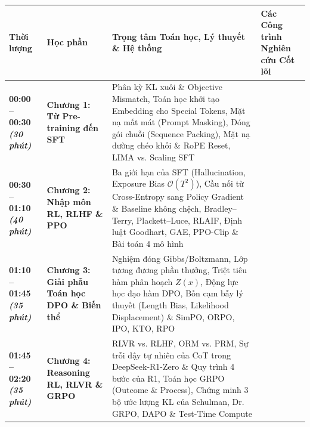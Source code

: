 \documentclass[11pt,a4paper,oneside]{report}
\theoremstyle{plain}
\theoremstyle{definition}
\theoremstyle{remark}
\begin{document}
\begin{table}[h!]
\centering
\small
\renewcommand{\arraystretch}{1.35}
\begin{tabularx}{\textwidth}{>{\bfseries}p{2.3cm} >{\bfseries}p{3.2cm} X p{3.8cm}}
\toprule
Thời lượng & Học phần & Trọng tâm Toán học, Lý thuyết \& Hệ thống & Các Công trình Nghiên cứu Cốt lõi \\
\midrule
00:00 -- 00:30 \newline \textit{(30 phút)} & Chương 1: \newline Từ Pre-training đến SFT & Phân kỳ KL xuôi \& Objective Mismatch, Toán học khởi tạo Embedding cho Special Tokens, Mặt nạ mất mát (Prompt Masking), Đóng gói chuỗi (Sequence Packing), Mặt nạ đường chéo khối \& RoPE Reset, LIMA vs. Scaling SFT & \citet{brown2020language, ouyang2022training, hewitt2021initializing, su2024roformer, zhou2023lima, dubey2024llama, lambert2024tulu} \\
\midrule
00:30 -- 01:10 \newline \textit{(40 phút)} & Chương 2: \newline Nhập môn RL, RLHF \& PPO & Ba giới hạn của SFT (Hallucination, Exposure Bias $\mathcal{O}(T^2)$), Cầu nối từ Cross-Entropy sang Policy Gradient \& Baseline không chệch, Bradley--Terry, Plackett--Luce, RLAIF, Định luật Goodhart, GAE, PPO-Clip \& Bài toán 4 mô hình & \citet{williams1992simple, bradley1952rank, schulman2016high, schulman2017proximal, christiano2017deep, stiennon2020learning, bai2022constitutional, gao2023scaling, kang2024unfamiliar} \\
\midrule
01:10 -- 01:45 \newline \textit{(35 phút)} & Chương 3: \newline Giải phẫu Toán học DPO \& Biến thể & Nghiệm đóng Gibbs/Boltzmann, Lớp tương đương phần thưởng, Triệt tiêu hàm phân hoạch $Z(x)$, Động lực học đạo hàm DPO, Bốn cạm bẫy lý thuyết (Length Bias, Likelihood Displacement) \& SimPO, ORPO, IPO, KTO, RPO & \citet{rafailov2023direct, azar2024general, ethayarajh2024kto, park2024disentangling, meng2024simpo, hong2024orpo, razin2024unintentional, pang2024iterative} \\
\midrule
01:45 -- 02:20 \newline \textit{(35 phút)} & Chương 4: \newline Reasoning RL, RLVR \& GRPO & RLVR vs. RLHF, ORM vs. PRM, Sự trỗi dậy tự nhiên của CoT trong DeepSeek-R1-Zero \& Quy trình 4 bước của R1, Toán học GRPO (Outcome \& Process), Chứng minh 3 bộ ước lượng KL của Schulman, Dr. GRPO, DAPO \& Test-Time Compute & \citet{lightman2023lets, shao2024deepseekmath, schulman2020approximating, deepseek2025r1, liu2025understanding, yu2025dapo, snell2024scaling, chen2021evaluating} \\

\end{tabularx}
\end{table}
\end{document}
